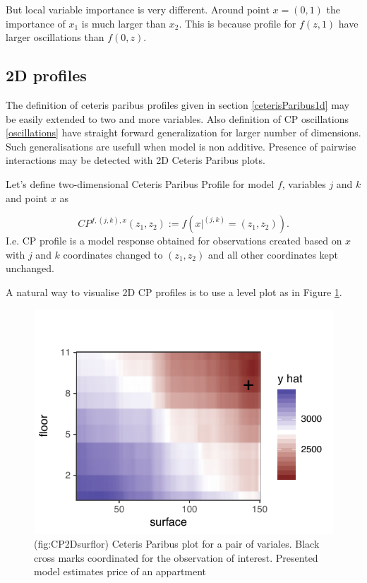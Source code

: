 \documentclass[]{krantz}
\theoremstyle{definition}
\theoremstyle{definition}
\theoremstyle{definition}
\theoremstyle{remark}
\begin{document}
But local variable importance is very different. Around point
\(x = (0, 1)\) the importance of \(x_1\) is much larger than \(x_2\).
This is because profile for \(f(z, 1)\) have larger oscillations than
\(f(0, z)\).

\hypertarget{d-profiles}{%
\subsection{2D profiles}\label{d-profiles}}

The definition of ceteris paribus profiles given in section
\ref{ceterisParibus1d} may be easily extended to two and more variables.
Also definition of CP oscillations \ref{oscillations} have straight
forward generalization for larger number of dimensions. Such
generalisations are usefull when model is non additive. Presence of
pairwise interactions may be detected with 2D Ceteris Paribus plots.

Let's define two-dimensional Ceteris Paribus Profile for model \(f\),
variables \(j\) and \(k\) and point \(x\) as

\[
CP^{f, (j,k), x}(z_1, z_2) := f(x|^{(j,k)} = (z_1,z_2)).
\] I.e. CP profile is a model response obtained for observations created
based on \(x\) with \(j\) and \(k\) coordinates changed to
\((z_1, z_2)\) and all other coordinates kept unchanged.

A natural way to visualise 2D CP profiles is to use a level plot as in
Figure \ref{fig:CP2Dsurflor}.

\begin{figure}

{\centering \includegraphics[width=0.6\linewidth]{figure/cp_2d_surf_floor} 

}

\caption{(fig:CP2Dsurflor) Ceteris Paribus plot for a pair of variales. Black cross marks coordinated for the observation of interest. Presented model estimates price of an appartment}\label{fig:CP2Dsurflor}
\end{figure}
\end{document}
